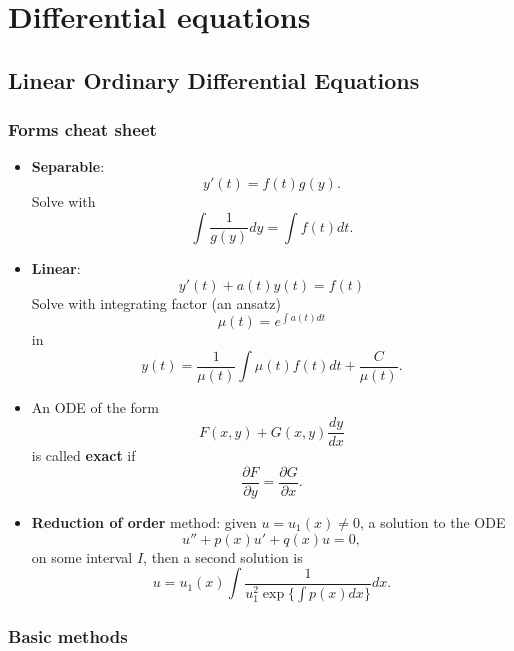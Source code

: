\chapter{Differential equations}

\section{Linear Ordinary Differential Equations}

\subsection{Forms cheat sheet}

\begin{itemize}
    \item \textbf{Separable}:
        $$ y'(t) = f(t) g(y) . $$
    Solve with
        $$ \int \frac{1}{g(y)} dy = \int f(t) dt . $$
    \item \textbf{Linear}:
        $$ y'(t) + a(t) y(t) = f(t) $$
    Solve with integrating factor (an ansatz)
        $$ \mu(t) = e^{\int a(t) dt} $$
    in
        $$ y(t) = \frac{1}{\mu(t)} \int \mu(t) f(t) dt
            + \frac{C}{\mu(t)} . $$
    \item An ODE of the form
        $$ F(x, y) + G(x, y) \frac{dy}{dx} $$
    is called \textbf{exact} if
        $$ \frac{\partial F}{\partial y}
            = \frac{\partial G}{\partial x} . $$
    \item \textbf{Reduction of order} method: given $u = u_1(x) \neq 0$, a solution to the ODE
        $$ u'' + p(x)u' + q(x)u = 0 , $$
    on some interval $I$, then a second solution is
        $$ u = u_1(x) \int \frac{1}{u_1^2
            \operatorname{exp}\bigl\{ \int p(x) dx \bigr\}} dx . $$
\end{itemize}

\newpage

\subsection{Basic methods}


